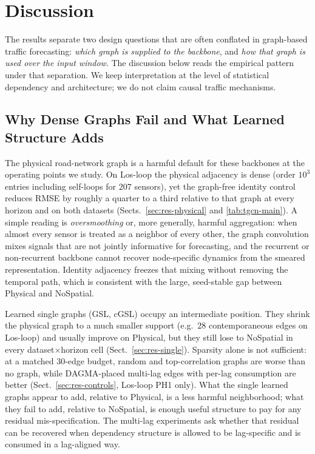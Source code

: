 \section{Discussion}\label{sec:discussion}

The results separate two design questions that are often conflated in
graph-based traffic forecasting: \emph{which graph is supplied to the
backbone}, and \emph{how that graph is used over the input window}. The
discussion below reads the empirical pattern under that separation. We keep
interpretation at the level of statistical dependency and architecture; we
do not claim causal traffic mechanisms.

\subsection{Why Dense Graphs Fail and What Learned Structure Adds}\label{sec:disc-dense}

The physical road-network graph is a harmful default for these backbones at
the operating points we study. On Los-loop the physical adjacency is dense
(order $10^{3}$ entries including self-loops for $207$ sensors), yet the
graph-free identity control reduces RMSE by roughly a quarter to a third
relative to that graph at every horizon and on both datasets
(Sects.~\ref{sec:res-physical} and \ref{tab:tgcn-main}). A simple reading is
\emph{oversmoothing} or, more generally, harmful aggregation: when almost
every sensor is treated as a neighbor of every other, the graph convolution
mixes signals that are not jointly informative for forecasting, and the
recurrent or non-recurrent backbone cannot recover node-specific dynamics
from the smeared representation. Identity adjacency freezes that mixing
without removing the temporal path, which is consistent with the large,
seed-stable gap between Physical and NoSpatial.

Learned single graphs (GSL, cGSL) occupy an intermediate position. They
shrink the physical graph to a much smaller support (e.g.\ $28$
contemporaneous edges on Los-loop) and usually improve on Physical, but they
still lose to NoSpatial in every dataset$\times$horizon cell
(Sect.~\ref{sec:res-single}). Sparsity alone is not sufficient: at a matched
$30$-edge budget, random and top-correlation graphs are worse than no graph,
while DAGMA-placed multi-lag edges with per-lag consumption are better
(Sect.~\ref{sec:res-controls}, Los-loop PH1 only). What the single learned
graphs appear to add, relative to Physical, is a less harmful neighborhood;
what they fail to add, relative to NoSpatial, is enough useful structure to
pay for any residual mis-specification. The multi-lag experiments ask
whether that residual can be recovered when dependency structure is allowed
to be lag-specific and is consumed in a lag-aligned way.

